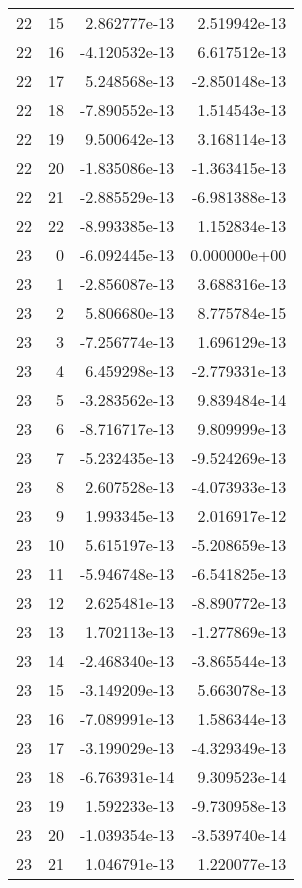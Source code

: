 \begin{tabular}{rrrr}
  22 &   15 &  2.862777e-13 &  2.519942e-13 \\
  22 &   16 & -4.120532e-13 &  6.617512e-13 \\
  22 &   17 &  5.248568e-13 & -2.850148e-13 \\
  22 &   18 & -7.890552e-13 &  1.514543e-13 \\
  22 &   19 &  9.500642e-13 &  3.168114e-13 \\
  22 &   20 & -1.835086e-13 & -1.363415e-13 \\
  22 &   21 & -2.885529e-13 & -6.981388e-13 \\
  22 &   22 & -8.993385e-13 &  1.152834e-13 \\
  23 &    0 & -6.092445e-13 &  0.000000e+00 \\
  23 &    1 & -2.856087e-13 &  3.688316e-13 \\
  23 &    2 &  5.806680e-13 &  8.775784e-15 \\
  23 &    3 & -7.256774e-13 &  1.696129e-13 \\
  23 &    4 &  6.459298e-13 & -2.779331e-13 \\
  23 &    5 & -3.283562e-13 &  9.839484e-14 \\
  23 &    6 & -8.716717e-13 &  9.809999e-13 \\
  23 &    7 & -5.232435e-13 & -9.524269e-13 \\
  23 &    8 &  2.607528e-13 & -4.073933e-13 \\
  23 &    9 &  1.993345e-13 &  2.016917e-12 \\
  23 &   10 &  5.615197e-13 & -5.208659e-13 \\
  23 &   11 & -5.946748e-13 & -6.541825e-13 \\
  23 &   12 &  2.625481e-13 & -8.890772e-13 \\
  23 &   13 &  1.702113e-13 & -1.277869e-13 \\
  23 &   14 & -2.468340e-13 & -3.865544e-13 \\
  23 &   15 & -3.149209e-13 &  5.663078e-13 \\
  23 &   16 & -7.089991e-13 &  1.586344e-13 \\
  23 &   17 & -3.199029e-13 & -4.329349e-13 \\
  23 &   18 & -6.763931e-14 &  9.309523e-14 \\
  23 &   19 &  1.592233e-13 & -9.730958e-13 \\
  23 &   20 & -1.039354e-13 & -3.539740e-14 \\
  23 &   21 &  1.046791e-13 &  1.220077e-13 \\

\end{tabular}
